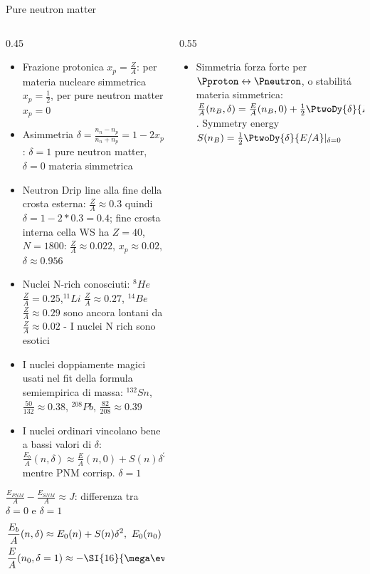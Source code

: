 \begin{frame}{Pure neutron matter}
    \begin{columns}[T]
        \begin{column}{0.45\textwidth}
    \begin{itemize}
        \item Frazione protonica $x_p=\frac{Z}{A}$: per materia nucleare simmetrica $x_p=\frac{1}{2}$, per pure neutron matter $x_p=0$
        \item Asimmetria $\delta=\frac{n_n-n_p}{n_n+n_p}=1-2x_p$: $\delta=1$ pure neutron matter, $\delta=0$ materia simmetrica
        \item Neutron Drip line alla fine della crosta esterna: $\frac{Z}{A}\approx0.3$ quindi $\delta=1-2*0.3=0.4$; fine crosta interna cella WS ha $Z=40$, $N=1800$: $\frac{Z}{A}\approx\num{0.022}$, $x_p\approx\num{0.02}$, $\delta\approx\num{0.956}$
        \item Nuclei N-rich conosciuti: $^8He$ $\frac{Z}{A}=0.25$,$^{11}Li$ $\frac{Z}{A}\approx0.27$, $^{14}Be$ $\frac{Z}{A}\approx0.29$ sono ancora lontani da $\frac{Z}{A}\approx\num{0.02}$ - I nuclei N rich sono esotici
        \item I nuclei doppiamente magici usati nel fit della formula semiempirica di massa: $^{132}Sn$, $\frac{50}{132}\approx\num{0.38}$, $^{208}Pb$, $\frac{82}{208}\approx\num{0.39}$
        \item I nuclei ordinari vincolano bene a bassi valori di $\delta$: $\frac{E_b}{A}(n,\delta)\approx \frac{E}{A}(n,0)+S(n)\delta^2+\ldots$ mentre PNM corrisp. $\delta=1$
    \end{itemize}
        $\frac{E_{PNM}}{A}-\frac{E_{SNM}}{A}\approx J$: differenza tra $\delta=0$ e $\delta=1$
            \begin{align*}
                &\frac{E_b}{A}(n,\delta)\approx E_0(n)+S(n)\delta^2,\ E_0(n_0)\approx-\SI{16}{\mega\ev}\\
                &\frac{E}{A}(n_0,\delta=1)\approx-\SI{16}{\mega\ev}+J\Rightarrow \frac{E}{A}|_{PNM}(n_0)\approx\SI{16}{\mega\ev}
            \end{align*}
        \end{column}
        \begin{column}{0.55\textwidth}
            \begin{itemize}
                \item Simmetria forza forte per $\Pproton\leftrightarrow\Pneutron$, o stabilit\'a materia simmetrica: $\frac{E}{A}(n_B,\delta)=\frac{E}{A}(n_B,0)+\frac{1}{2}\PtwoDy{\delta}{E/A}|_{\delta=0}\delta^2+O(\delta^4)$. Symmetry energy $S(n_B)=\frac{1}{2}\PtwoDy{\delta}{E/A}|_{\delta=0}$

\end{itemize}
\end{column}
\end{columns}
\end{frame}
